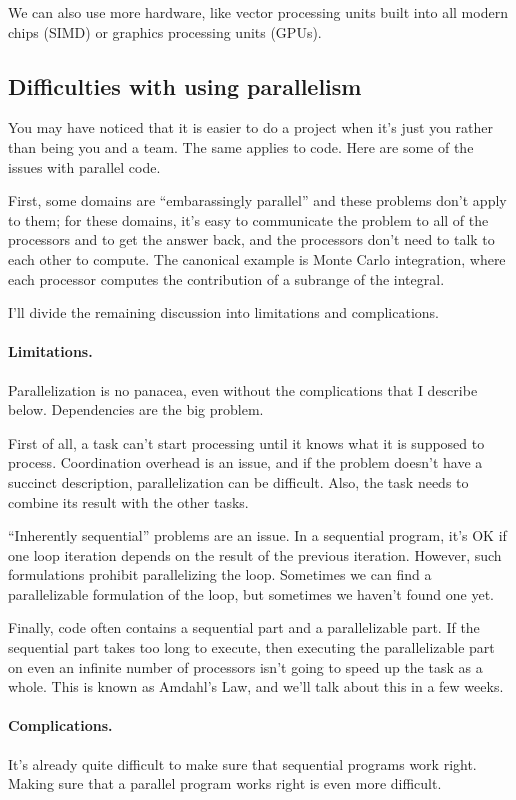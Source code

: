 We can also use more hardware, like vector processing units built into all modern
chips (SIMD) or graphics processing units (GPUs).

\subsection*{Difficulties with using parallelism}
You may have noticed that it is easier to do a project when it's just
you rather than being you and a team. The same applies to code.
Here are some of the issues with parallel code.

First, some domains are ``embarassingly parallel'' and these problems
don't apply to them; for these domains, it's easy to communicate
the problem to all of the processors and to get the answer back, and
the processors don't need to talk to each other to compute. The canonical
example is Monte Carlo integration, where each processor computes the
contribution of a subrange of the integral.

I'll divide the remaining discussion into limitations and complications.

\paragraph{Limitations.} Parallelization is no panacea, even without
the complications that I describe below. Dependencies are the
big problem.

First of all, a task can't start processing until it knows what it
is supposed to process. Coordination overhead is an issue, and if the
problem doesn't have a succinct description, parallelization can be
difficult. Also, the task needs to combine its result with the other
tasks.

``Inherently sequential'' problems are an issue. In a sequential 
program, it's OK if one loop iteration depends on the result of the
previous iteration. However, such formulations prohibit parallelizing
the loop. Sometimes we can find a parallelizable formulation of the loop,
but sometimes we haven't found one yet.

Finally, code often contains a sequential part and a parallelizable
part.  If the sequential part takes too long to execute, then
executing the parallelizable part on even an infinite number of
processors isn't going to speed up the task as a whole. This is
known as Amdahl's Law, and we'll talk about this in a few weeks.

\paragraph{Complications.} It's already quite difficult to make sure that
sequential programs work right. Making sure that a parallel program
works right is even more difficult.

